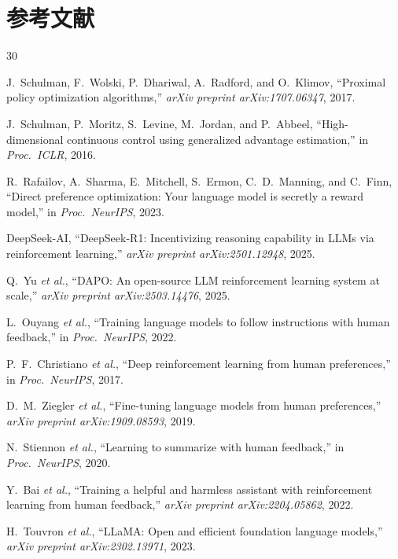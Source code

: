 \section*{参考文献}
\begin{thebibliography}{30}

J.~Schulman, F.~Wolski, P.~Dhariwal, A.~Radford, and O.~Klimov, ``Proximal policy optimization algorithms,'' \textit{arXiv preprint arXiv:1707.06347}, 2017.

J.~Schulman, P.~Moritz, S.~Levine, M.~Jordan, and P.~Abbeel, ``High-dimensional continuous control using generalized advantage estimation,'' in \textit{Proc.\ ICLR}, 2016.

R.~Rafailov, A.~Sharma, E.~Mitchell, S.~Ermon, C.~D.~Manning, and C.~Finn, ``Direct preference optimization: Your language model is secretly a reward model,'' in \textit{Proc.\ NeurIPS}, 2023.

DeepSeek-AI, ``DeepSeek-R1: Incentivizing reasoning capability in LLMs via reinforcement learning,'' \textit{arXiv preprint arXiv:2501.12948}, 2025.

Q.~Yu \textit{et al.}, ``DAPO: An open-source LLM reinforcement learning system at scale,'' \textit{arXiv preprint arXiv:2503.14476}, 2025.

L.~Ouyang \textit{et al.}, ``Training language models to follow instructions with human feedback,'' in \textit{Proc.\ NeurIPS}, 2022.

P.~F.~Christiano \textit{et al.}, ``Deep reinforcement learning from human preferences,'' in \textit{Proc.\ NeurIPS}, 2017.

D.~M.~Ziegler \textit{et al.}, ``Fine-tuning language models from human preferences,'' \textit{arXiv preprint arXiv:1909.08593}, 2019.

N.~Stiennon \textit{et al.}, ``Learning to summarize with human feedback,'' in \textit{Proc.\ NeurIPS}, 2020.

Y.~Bai \textit{et al.}, ``Training a helpful and harmless assistant with reinforcement learning from human feedback,'' \textit{arXiv preprint arXiv:2204.05862}, 2022.

H.~Touvron \textit{et al.}, ``LLaMA: Open and efficient foundation language models,'' \textit{arXiv preprint arXiv:2302.13971}, 2023.


\end{thebibliography}

